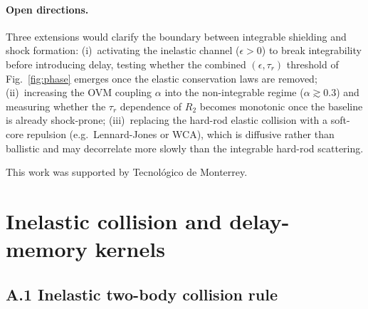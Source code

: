 \documentclass[aps,pre,twocolumn,superscriptaddress,longbibliography,floatfix]{revtex4-2}
\begin{document}
\paragraph*{Open directions.}
Three extensions would clarify the boundary between
integrable shielding and shock formation:
(i)~activating the inelastic channel ($\epsilon>0$) to
break integrability before introducing delay, testing
whether the combined $(\epsilon,\tau_r)$ threshold of
Fig.~\ref{fig:phase} emerges once the elastic conservation
laws are removed;
(ii)~increasing the OVM coupling $\alpha$ into the
non-integrable regime ($\alpha\gtrsim 0.3$) and measuring
whether the $\tau_r$ dependence of $R_2$ becomes monotonic
once the baseline is already shock-prone;
(iii)~replacing the hard-rod elastic collision with a
soft-core repulsion (e.g.\ Lennard-Jones or WCA), which is
diffusive rather than ballistic and may decorrelate more
slowly than the integrable hard-rod scattering.

\begin{acknowledgments}
This work was supported by Tecnol\'ogico de Monterrey.
\end{acknowledgments}

\appendix

\section{Inelastic collision and delay-memory kernels}
\label{app:kernels}

\subsection*{A.1 Inelastic two-body collision rule}
\end{document}
